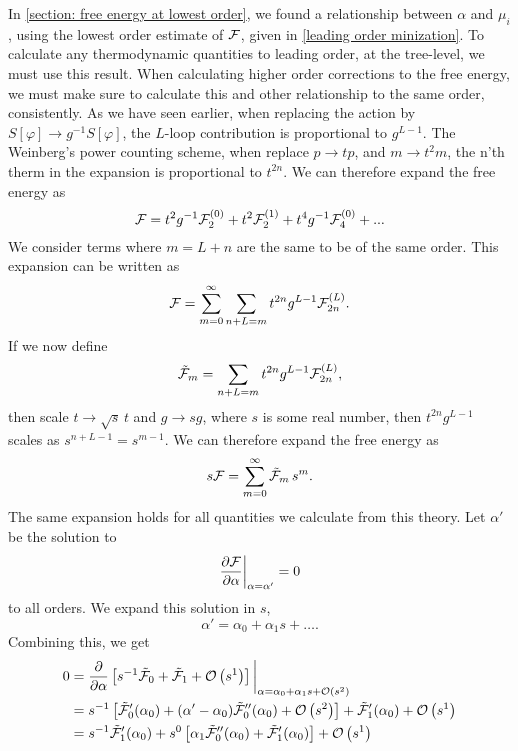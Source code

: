 In \autoref{section: free energy at lowest order}, we found a relationship between $\alpha$ and $\mu_i$, using the lowest order estimate of $\mathcal{F}$, given in \cref{leading order minization}.
To calculate any thermodynamic quantities to leading order, at the tree-level, we must use this result.
When calculating higher order corrections to the free energy, we must make sure to calculate this and other relationship to the same order, consistently.
As we have seen earlier, when replacing the action by $S[\varphi] \rightarrow g^{-1}S[\varphi]$, the $L$-loop contribution is proportional to $g^{L-1}$.
The Weinberg's power counting scheme, when replace $p \rightarrow t p$, and $m \rightarrow t^2 m$, the n'th therm in the expansion is proportional to $t^{2n}$.
We can therefore expand the free energy as
\begin{equation}
    \mathcal{F} = t^2 g^{-1} \mathcal{F}_2^{(0)} + t^2 \mathcal{F}_2^{(1)} + t^4 g^{-1} \mathcal{F}_4^{(0)}
    + ...
\end{equation}
We consider terms where $m = L + n$ are the same to be of the same order.
This expansion can be written as
\begin{equation}
    \mathcal{F} = \sum_{m=0}^\infty \sum_{n+L=m} t^{2n} g^{L-1} \mathcal{F}_{2n}^{(L)}.
\end{equation}
If we now define
\begin{equation}
    \tilde {\mathcal{F}}_m = \sum_{n+L=m} t^{2n} g^{L-1} \mathcal{F}_{2n}^{(L)},
\end{equation}
then scale $t \rightarrow \sqrt{s} \, t$ and $g \rightarrow s g$, where $s$ is some real number, then $t^{2n}g^{L-1}$ scales as $s^{n+L-1} = s^{m-1}$.
We can therefore expand the free energy as
\begin{equation}
    s \mathcal{F} = \sum_{m= 0}^\infty \tilde {\mathcal{F}}_m \, s^{m}.
\end{equation}
The same expansion holds for all quantities we calculate from this theory.
Let $\alpha'$ be the solution to
\begin{equation}
    \diffp{\Ef}{\alpha} \bigg|_{\alpha=\alpha'} = 0
\end{equation}
to all orders.
We expand this solution in $s$,
\begin{equation}
    \alpha' = \alpha_0 + \alpha_1 s + \dots.
\end{equation}
Combining this, we get
\begin{align*}
    0 &
    = 
    \diffp{}{\alpha}
    \left[
        s^{-1}\tilde \Ef_0
        + 
        \tilde \Ef_1
        +
        \Oh[1]{s}
    \right]
    \bigg|_{\alpha=\alpha_0 + \alpha_1 s + \Oh{s}} 
    \\
    & = 
    s^{-1 }
    \left[
        \tilde \Ef_0'(\alpha_0)
        +
        (\alpha' - \alpha_0)
        \tilde \Ef_0''(\alpha_0)
        +
        \Oh[2]{s}
    \right]
    +
    \tilde\Ef_1'(\alpha_0)
    +
    \Oh[1]{s} \\
    &
    =
    s^{-1} \tilde\Ef_1'(\alpha_0)
    + s^{0}
    \left[
        \alpha_1
        \tilde \Ef_0''(\alpha_0)
        +
    \tilde\Ef_1'(\alpha_0)
    \right]
    +
    \Oh[1]{s}
\end{align*}
